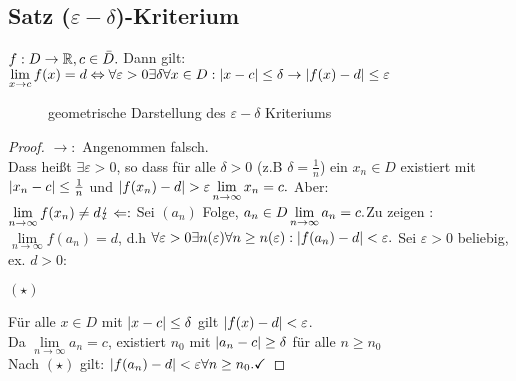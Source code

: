 \subsection{Satz ($\varepsilon-\delta$)-Kriterium}
$f: D \rightarrow \mathbb{R}, c \in \bar{D}.$ Dann gilt: $\lim\limits_{x \rightarrow c} f(x) = d \Leftrightarrow \forall \varepsilon > 0 \exists \delta \forall x \in D : \lvert x-c \rvert \leq \delta \rightarrow \lvert f(x)-d \rvert \leq \varepsilon$
\begin{figure}[h!]
\centering
\caption{geometrische Darstellung des $\varepsilon-\delta$ Kriteriums}
\end{figure}
\begin{proof}
$\rightarrow:$ Angenommen falsch.\\
Dass hei\ss t $\exists \varepsilon > 0$, so dass für alle $\delta >0$ (z.B $\delta = \frac{1}{n}$) ein $x_n \in D$ existiert mit $\lvert x_n -c \rvert \leq \frac{1}{n}$ und $\lvert f(x_n) -d \rvert > \varepsilon\\
\lim\limits_{n \rightarrow \infty} x_n =c.$ Aber:\\
$\lim\limits_{n \rightarrow \infty} f(x_n) \not = d \lightning\\
\Leftarrow:$ Sei $(a_n)$ Folge, $a_n \in D\\
\lim\limits_{n \rightarrow \infty} a_n =c.\\
$Zu zeigen : $ \lim\limits_{n \rightarrow \infty} f(a_n) =d$, d.h $\forall \varepsilon > 0 \exists n(\varepsilon) \forall n \geq n(\varepsilon): \lvert f(a_n)-d \rvert < \varepsilon.\\
$ Sei $\varepsilon >0$ beliebig, ex. $ d > 0$:
\begin{flushright}$(\star)$\end{flushright}
Für alle $x \in D$ mit \underline{$\lvert x-c \rvert \leq \delta$} gilt $\lvert f(x) -d \rvert < \varepsilon$.\\
Da $\lim\limits_{n \rightarrow \infty} a_n =c$, existiert $n_0$ mit $\lvert a_n -c \rvert \geq \delta$ für alle $n \geq n_0$\\
Nach $(\star)$ gilt: $\lvert f(a_n) -d \rvert < \varepsilon \forall n \geq n_0. \checkmark$
\end{proof}
